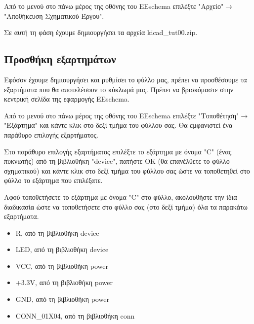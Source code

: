 \documentclass[a4paper]{article}
\begin{document}
Από το μενού στο πάνω μέρος της οθόνης του EEschema επιλέξτε "Αρχείο"$\rightarrow$"Αποθήκευση Σχηματικού Έργου".

\begin{figure}
  \begin{center}
    \label{fig:kicad-main}
  \end{center}
\end{figure}

Σε αυτή τη φάση έχουμε δημιουργήσει τα αρχεία kicad\_tut00.zip.

\subsection{Προσθήκη εξαρτημάτων}
Εφόσον έχουμε δημιουργήσει και ρυθμίσει το φύλλο μας, πρέπει να προσθέσουμε τα εξαρτήματα που θα αποτελέσουν το κύκλωμά μας. Πρέπει να βρισκόμαστε στην κεντρική σελίδα της εφαρμογής EEschema.

Από το μενού στο πάνω μέρος της οθόνης του EEschema επιλέξτε "Τοποθέτηση"$\rightarrow$"Εξάρτημα" και κάντε κλικ στο δεξί τμήμα του φύλλου σας. Θα εμφανιστεί ένα παράθυρο επιλογής εξαρτήματος.

\begin{figure}
  \begin{center}
    \label{fig:kicad-main}
  \end{center}
\end{figure}

Στο παράθυρο επιλογής εξαρτήματος επιλέξτε το εξάρτημα με όνομα "C" (ένας πυκνωτής) από τη βιβλιοθήκη "device", πατήστε ΟΚ (θα επανέλθετε το φύλλο σχηματικού) και κάντε κλικ στο δεξί τμήμα του φύλλου σας ώστε να τοποθετηθεί στο φύλλο το εξάρτημα που επιλέξατε. 

Αφού τοποθετήσετε το εξάρτημα με όνομα "C" στο φύλλο, ακολουθήστε την ίδια διαδικασία ώστε να τοποθετήσετε στο φύλλο σας (στο δεξί τμήμα) όλα τα παρακάτω εξαρτήματα. 

\begin{itemize}
    \item R, από τη βιβλιοθήκη device
    \item LED, από τη βιβλιοθήκη device
    \item VCC, από τη βιβλιοθήκη power
    \item +3.3V, από τη βιβλιοθήκη power
    \item GND, από τη βιβλιοθήκη power
    \item CONN\_01X04, από τη βιβλιοθήκη conn
\end{itemize}
\end{document}
